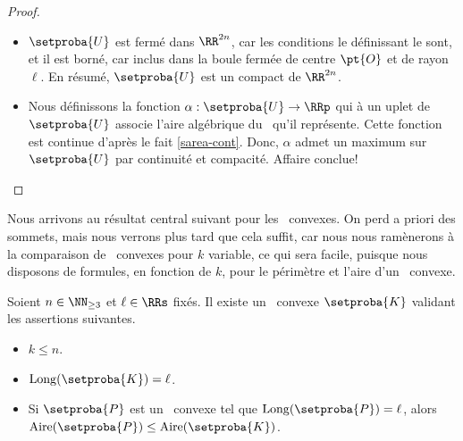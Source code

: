\begin{proof}
\begin{itemize}
        \item $\setproba{U}$ est fermé dans $\RR^{2n}$, car les conditions le définissant le sont, et il est borné, car inclus dans la boule fermée de centre $\pt{O}$ et de rayon $\ell$.
        En résumé, $\setproba{U}$ est un compact de $\RR^{2n}$.


        \item Nous définissons la fonction $\alpha: \setproba{U} \rightarrow \RRp$ qui à un uplet de $\setproba{U}$ associe l'aire algébrique du \ncycle\ qu'il représente.
        Cette fonction est continue d'après le fait \ref{sarea-cont}.
        Donc, $\alpha$ admet un maximum sur $\setproba{U}$ par continuité et compacité. Affaire conclue!
    \end{itemize}
	
	\null\vspace{-6ex}
\end{proof}



\newpage

Nous arrivons au résultat central suivant pour les \ngones\ convexes. On perd a priori des sommets, mais nous verrons plus tard que cela suffit, car nous nous ramènerons à la comparaison de \kregs\ convexes pour $k$ variable, ce qui sera facile, puisque nous disposons de formules, en fonction de $k$, pour le périmètre et l'aire d'un \kreg\ convexe.


\begin{fact} \label{at-least-one-kgone}
    Soient $n \in \NN_{\geq3}$ et $\ell \in \RRs$ fixés.
    Il existe un \kgone\ convexe $\setproba{K}$ validant les assertions suivantes.
	\begin{itemize}
		\item $k \leq n$.

		\item $\cyclelen{\setproba{K}} = \ell$.

		\item Si $\setproba{P}$ est un \ngone\ convexe tel que $\cyclelen{\setproba{P}} = \ell$, alors $\area{\setproba{P}} \leq \area{\setproba{K}}$.
    \end{itemize}
\end{fact}


